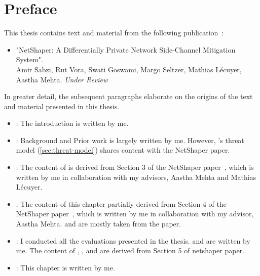 
\chapter{Preface}

This thesis contains text and material from the following publication~\cite{netshaper}:
\begin{itemize}
  \item "NetShaper: A Differentially Private Network Side-Channel Mitigation System".
  \\
  Amir Sabzi, Rut Vora, Swati Goswami, Margo Seltzer, Mathias Lécuyer, Aastha Mehta. \textit{Under Review}
\end{itemize}
In greater detail, the subsequent paragraphs elaborate on the origins of the text and material presented in this thesis.
\begin{itemize}
  \item \textbf{}: The introduction is written by me. 
  \item \textbf{}: Background and Prior work is largely written by me. However, {\sys}'s threat model (\ref{sec:threat-model}) shares content with the NetShaper paper.
  \item \textbf{}: The content of  is derived from Section 3 of the NetShaper paper~\cite{netshaper}, which is written by me in collaboration with my advisors, Aastha Mehta and Mathias L\'{e}cuyer. 
  \item \textbf{}: The content of this chapter partially derived from Section 4 of the NetShaper paper~\cite{netshaper}, which is written by me in collaboration with my advisor, Aastha Mehta.  and  are mostly taken from the paper.
  \item \textbf{}: I conducted all the evaluations presented in the thesis.
   and  are written by me. The content of , , and  are derived from Section 5 of netshaper paper. 
  \item \textbf{}: This chapter is written by me.




\end{itemize}